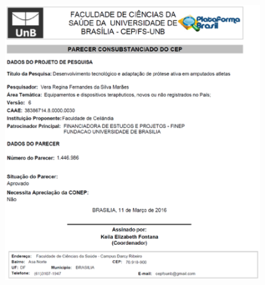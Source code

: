 \begin{anexosenv}
\begin{figure}[ht]
	    \centering
	    \label{fig23}
	        \includegraphics[keepaspectratio=true, scale=0.75]{editaveis/images/folha_plataforma_brasil.eps}
\end{figure} 

\end{anexosenv}

